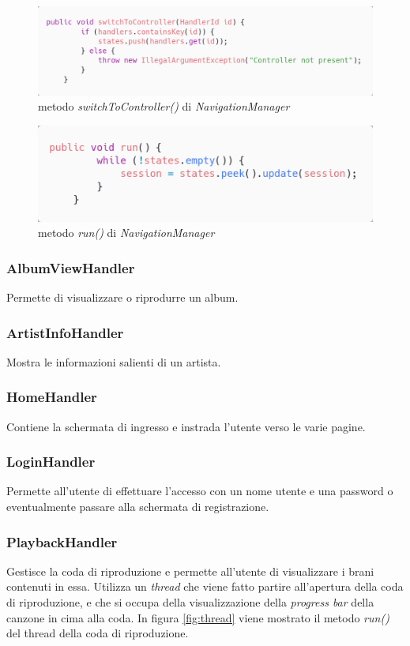 \documentclass{article}
\begin{document}
  \begin{figure}[H]
    \centering
    \includegraphics[width=0.8\linewidth]{switchToController.png}
    \caption{metodo \textit{switchToController()} di \textit{NavigationManager}}
    \label{fig:switchToController}
  \end{figure}

  \begin{figure}[H]
    \centering
    \includegraphics[width=0.8\linewidth]{run.png}
    \caption{metodo \textit{run()} di \textit{NavigationManager}}
    \label{fig:run}
  \end{figure}

  \subsubsection{AlbumViewHandler}
  Permette di visualizzare o riprodurre un album.
  \subsubsection{ArtistInfoHandler}
  Mostra le informazioni salienti di un artista.
  \subsubsection{HomeHandler}
  Contiene la schermata di ingresso e instrada l'utente verso le varie pagine.
  \subsubsection{LoginHandler}
  Permette all'utente di effettuare l'accesso con un nome utente e una password o
  eventualmente passare alla schermata di registrazione.

  \subsubsection{PlaybackHandler}
  Gestisce la coda di riproduzione e permette all'utente di visualizzare i brani contenuti in essa. Utilizza un \textit{thread} che viene fatto partire all'apertura della coda di riproduzione, e che si occupa della visualizzazione della \textit{progress bar} della canzone in cima alla coda.
  In figura \ref{fig:thread} viene mostrato il metodo \textit{run()} del thread della coda di riproduzione.
\end{document}
